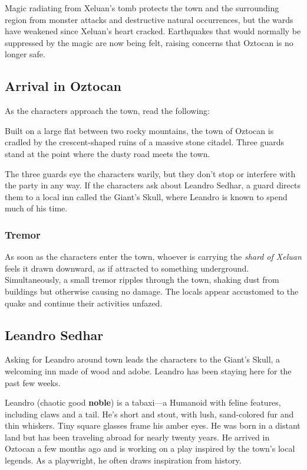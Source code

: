 \documentclass[10pt,a4paper,twoside,bg=print,twocolumn,openany,nodeprecatedcode]{dndbook}
\begin{document}
Magic radiating from Xeluan's tomb protects the town and the surrounding region from monster attacks and destructive natural occurrences, but the wards have weakened since Xeluan's heart cracked. Earthquakes that would normally be suppressed by the magic are now being felt, raising concerns that Oztocan is no longer safe.

\subsection{Arrival in Oztocan}
As the characters approach the town, read the following:

\begin{DndReadAloud}{}
Built on a large flat between two rocky mountains, the town of Oztocan is cradled by the crescent-shaped ruins of a massive stone citadel. Three guards stand at the point where the dusty road meets the town.

\end{DndReadAloud}

The three guards eye the characters warily, but they don't stop or interfere with the party in any way. If the characters ask about Leandro Sedhar, a guard directs them to a local inn called the Giant's Skull, where Leandro is known to spend much of his time.

\subsubsection{Tremor}
As soon as the characters enter the town, whoever is carrying the \textit{shard of Xeluan} feels it drawn downward, as if attracted to something underground. Simultaneously, a small tremor ripples through the town, shaking dust from buildings but otherwise causing no damage. The locals appear accustomed to the quake and continue their activities unfazed.

\subsection{Leandro Sedhar}
Asking for Leandro around town leads the characters to the Giant's Skull, a welcoming inn made of wood and adobe. Leandro has been staying here for the past few weeks.

Leandro (chaotic good \textbf{noble}) is a tabaxi—a Humanoid with feline features, including claws and a tail. He's short and stout, with lush, sand-colored fur and thin whiskers. Tiny square glasses frame his amber eyes. He was born in a distant land but has been traveling abroad for nearly twenty years. He arrived in Oztocan a few months ago and is working on a play inspired by the town's local legends. As a playwright, he often draws inspiration from history.
\end{document}
